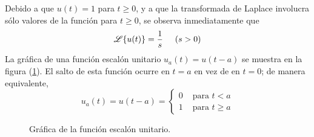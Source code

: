 Debido a que $u(t) = 1$ para $t \geq 0$, y a que la transformada de Laplace involucra sólo valores de la función para $t \geq 0$, se observa inmediatamente que
\begin{equation}
\mathscr{L} \{ u(t) \} = \dfrac{1}{s} \hspace{0.5cm} (s > 0)
\label{eq:020}
\end{equation}
La gráfica de una función escalón unitario $u_{a}(t) = u(t - a)$ se muestra en la figura (\ref{fig:figura_003}). El salto de esta función ocurre en $t = a$ en vez de en $t = 0$; de manera equivalente,
\begin{equation}
u_{a}(t) = u (t - a) = \begin{cases}
0 & \mbox{ para } t < a \\
1 & \mbox{ para } t \geq a
\end{cases}
\end{equation}
\begin{figure}[H]
    \centering
    
    \caption{Gráfica de la función escalón unitario.}
    \label{fig:figura_003}
\end{figure}
